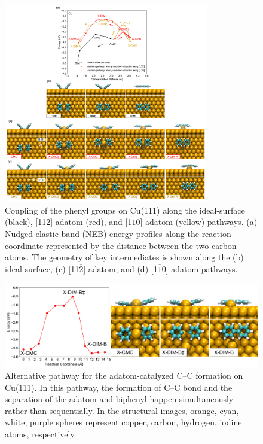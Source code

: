 \documentclass[journal=jpclcd,layout=traditional,manuscript=letter]{achemso} %
\begin{document}
\begin{figure}[bt]
\centering
\includegraphics[width=0.8\textwidth]{Fig/distance-energy-SI.pdf}
\caption{Coupling of the phenyl groups on Cu(111) along the ideal-surface (black),  [11$\overline{2}$] adatom (red), and  [1$\overline{1}$0] adatom (yellow) pathways. (a) Nudged elastic band (NEB) energy profiles along the reaction coordinate represented by the distance between the two carbon atoms. The geometry of key intermediates is shown along the (b) ideal-surface, (c) [11$\overline{2}$] adatom, and (d) [1$\overline{1}$0] adatom pathways.}
\label{fig:distance-energy}
\end{figure}

\begin{figure}[hbt]
\centering
\includegraphics[width=1.0\textwidth]{Fig/AlterPath.pdf}
\caption{Alternative pathway for the adatom-catalyzed C--C formation on Cu(111). In this pathway, the formation of C--C bond and the separation of the adatom and biphenyl happen simultaneously rather than sequentially. In the structural images, orange, cyan, white, purple spheres represent copper, carbon, hydrogen, iodine atoms, respectively.}
\label{fig:AlterPath}
\end{figure} 
\end{document}

